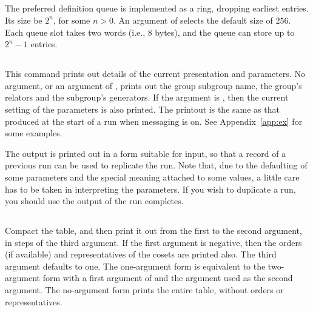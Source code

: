 \subsection{}

The preferred definition queue is implemented as a ring, dropping
  earliest entries.
Its size  be $2^n$\kern-2pt, for some $n>0$.
An argument of  selects the default size of $256$.
Each queue slot takes two words (i.e., 8 bytes), and the queue can store
  up to $2^n-1$ entries.

\subsection{}

This command prints out details of the current presentation and parameters.
No argument, or an argument of , prints out the group \amp
  subgroup name, the group's relators and the subgroup's generators.
If the argument is , then the current setting of the parameters is
  also printed.
The printout is the same as that produced at the start of a run when
  messaging is on.
See Appendix~\ref{app:ex} for some examples.

The output is printed out in a form suitable for input, so that a record
  of a previous run can be used to replicate the run.
Note that, due to the defaulting of some parameters and the special
  meaning attached to some values, a little care has to be taken in
  interpreting the parameters.
If you wish to  duplicate a run, you should use the output
  of   the run completes.

\subsection{}

Compact the table, and then print it out from the first to the second
  argument, in steps of the third argument.
If the first argument is negative, then the orders (if available) and
  representatives of the cosets are printed also.
The third argument defaults to one.
The one-argument form is equivalent to the two-argument form with a first
  argument of  and the argument used as the second argument.
The no-argument form prints the entire table, without orders or
  representatives.


